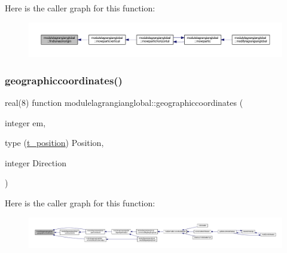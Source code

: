 Here is the caller graph for this function\+:\nopagebreak
\begin{figure}[H]
\begin{center}
\leavevmode
\includegraphics[width=350pt]{namespacemodulelagrangianglobal_a0358a516f0009b4fbeb3513332511d63_icgraph}
\end{center}
\end{figure}
\mbox{\label{namespacemodulelagrangianglobal_ab37072f11c5d0760a6306426f0173b84}} 
\subsubsection{\texorpdfstring{geographiccoordinates()}{geographiccoordinates()}}
{\footnotesize\ttfamily real(8) function modulelagrangianglobal\+::geographiccoordinates (\begin{DoxyParamCaption}\item[{integer}]{em,  }\item[{type (\mbox{\hyperlink{structmodulelagrangianglobal_1_1t__position}{t\+\_\+position}})}]{Position,  }\item[{integer}]{Direction }\end{DoxyParamCaption})\hspace{0.3cm}{\ttfamily [private]}}

Here is the caller graph for this function\+:\nopagebreak
\begin{figure}[H]
\begin{center}
\leavevmode
\includegraphics[width=350pt]{namespacemodulelagrangianglobal_ab37072f11c5d0760a6306426f0173b84_icgraph}
\end{center}
\end{figure}
\mbox{\label{namespacemodulelagrangianglobal_a21c98c8cc24ebb92a5b8821af08be797}} 
